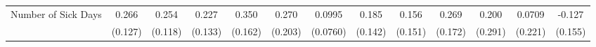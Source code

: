 {\begin{tabular}{l*{12}{c}}
\addlinespace
Number of Sick Days&       0.266\sym{*}  &       0.254\sym{*}  &       0.227         &       0.350\sym{*}  &       0.270         &      0.0995         &       0.185         &       0.156         &       0.269         &       0.200         &      0.0709         &      -0.127         \\
            &     (0.127)         &     (0.118)         &     (0.133)         &     (0.162)         &     (0.203)         &    (0.0760)         &     (0.142)         &     (0.151)         &     (0.172)         &     (0.291)         &     (0.221)         &     (0.155)         \\
\bottomrule
\end{tabular}
}
